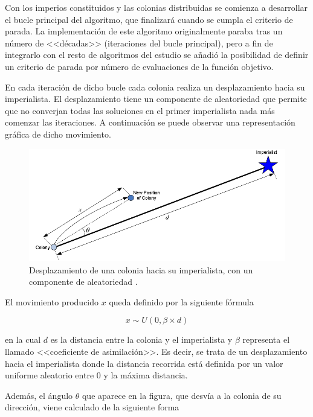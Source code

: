Con los imperios constituidos y las colonias distribuidas se comienza a desarrollar el bucle principal del algoritmo, que finalizará cuando se cumpla el criterio de parada. La implementación de este algoritmo originalmente paraba tras un número de <<décadas>> (iteraciones del bucle principal), pero a fin de integrarlo con el resto de algoritmos del estudio se añadió la posibilidad de definir un criterio de parada por número de evaluaciones de la función objetivo.

En cada iteración de dicho bucle cada colonia realiza un desplazamiento hacia su imperialista. El desplazamiento tiene un componente de aleatoriedad que permite que no converjan todas las soluciones en el primer imperialista nada más comenzar las iteraciones. A continuación se puede observar una representación gráfica de dicho movimiento.

\begin{figure}[h]
	\centering
	\includegraphics[scale=0.4]{imagenes/ica-desplazamiento.png}
	\caption{Desplazamiento de una colonia hacia su imperialista, con un componente de aleatoriedad \cite{ica-conference}.}
	\label{ica-desplazamiento}
\end{figure}

El movimiento producido $x$ queda definido por la siguiente fórmula

\begin{equation}\label{ica-eq-desplazamiento1}
x \sim U(0, \beta \times d)
\end{equation}

en la cual $d$ es la distancia entre la colonia y el imperialista y $\beta$ representa el llamado <<coeficiente de asimilación>>. Es decir, se trata de un desplazamiento hacia el imperialista donde la distancia recorrida está definida por un valor uniforme aleatorio entre 0 y la máxima distancia.

Además, el ángulo $\theta$ que aparece en la figura, que desvía a la colonia de su dirección, viene calculado de la siguiente forma

